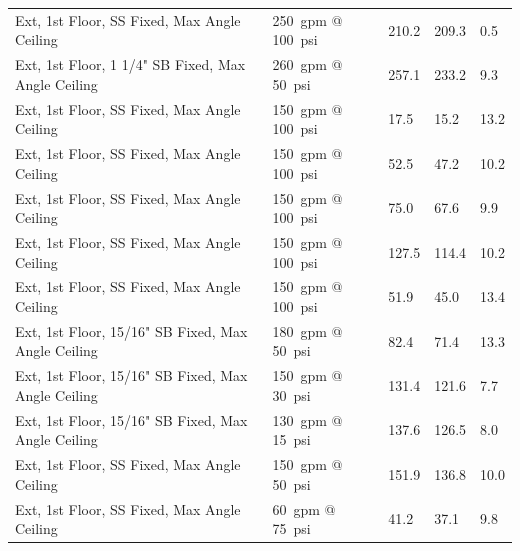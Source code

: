 \documentclass[12pt,oneside]{book}
\begin{document}
\begin{table}[!ht]
\begin{tabular}{lllll}
Ext, 1st Floor, SS Fixed, Max Angle Ceiling           & 250~gpm @ 100~psi              & 210.2                             & 209.3                              & 0.5                    \\
Ext, 1st Floor, 1 1/4" SB Fixed, Max Angle Ceiling    & 260~gpm @ 50~psi               & 257.1                             & 233.2                              & 9.3                    \\
Ext, 1st Floor, SS Fixed, Max Angle Ceiling           & 150~gpm @ 100~psi              & 17.5                              & 15.2                               & 13.2                   \\
Ext, 1st Floor, SS Fixed, Max Angle Ceiling           & 150~gpm @ 100~psi              & 52.5                              & 47.2                               & 10.2                   \\
Ext, 1st Floor, SS Fixed, Max Angle Ceiling           & 150~gpm @ 100~psi              & 75.0                              & 67.6                               & 9.9                    \\
Ext, 1st Floor, SS Fixed, Max Angle Ceiling           & 150~gpm @ 100~psi              & 127.5                             & 114.4                              & 10.2                   \\
Ext, 1st Floor, SS Fixed, Max Angle Ceiling           & 150~gpm @ 100~psi              & 51.9                              & 45.0                               & 13.4                   \\
Ext, 1st Floor, 15/16" SB Fixed, Max Angle Ceiling    & 180~gpm @ 50~psi               & 82.4                              & 71.4                               & 13.3                   \\
Ext, 1st Floor, 15/16" SB Fixed, Max Angle Ceiling    & 150~gpm @ 30~psi               & 131.4                             & 121.6                              & 7.7                    \\
Ext, 1st Floor, 15/16" SB Fixed, Max Angle Ceiling    & 130~gpm @ 15~psi               & 137.6                             & 126.5                              & 8.0                    \\
Ext, 1st Floor, SS Fixed, Max Angle Ceiling           & 150~gpm @ 50~psi               & 151.9                             & 136.8                              & 10.0                   \\
Ext, 1st Floor, SS Fixed, Max Angle Ceiling           & 60~gpm @ 75~psi                &  41.2                             & 37.1                               & 9.8                    \\

\end{tabular}
\end{table}
\end{document}
